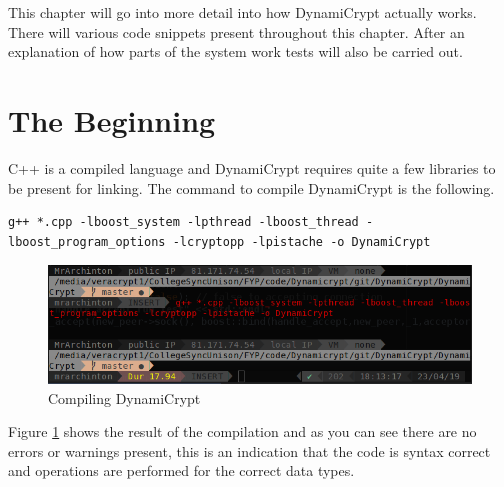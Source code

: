 %
%
This chapter will go into more detail into how DynamiCrypt actually works. There will various code snippets present throughout this chapter. After an explanation of how parts of the system work tests will also be carried out. 

\section{The Beginning}
C++ is a compiled language and DynamiCrypt requires quite a few libraries to be present for linking. The command to compile DynamiCrypt is the following.
\begin{lstlisting}
g++ *.cpp -lboost_system -lpthread -lboost_thread -lboost_program_options -lcryptopp -lpistache -o DynamiCrypt
\end{lstlisting}

\begin{figure}[!h]
  \centering
      \includegraphics[width=1\textwidth]{Figures/b1.png}
  \caption[Compiling DynamiCrypt]{Compiling DynamiCrypt}
  \label{fig:b1}
\end{figure}
\FloatBarrier

Figure \ref{fig:b1} shows the result of the compilation and as you can see there are no errors or warnings present, this is an indication that the code is syntax correct and operations are performed for the correct data types.

